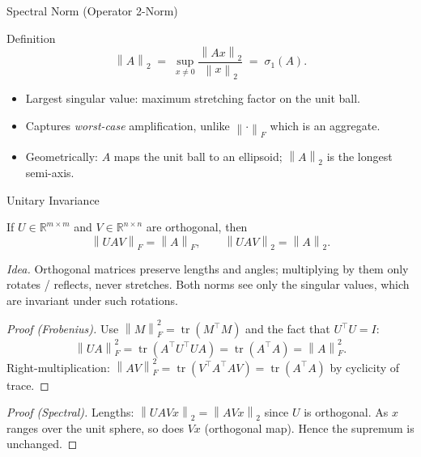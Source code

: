 \documentclass[10pt,aspectratio=169]{beamer}
\DeclareMathOperator{\tr}{tr}
\newcommand{\R}{\mathbb{R}}
\newcommand{\norm}[1]{\left\|#1\right\|}
\begin{document}
\begin{frame}{Spectral Norm (Operator 2-Norm)}
  \begin{block}{Definition}
    \[
      \norm{A}_2 \;=\; \sup_{x \neq 0} \frac{\norm{Ax}_2}{\norm{x}_2}
                 \;=\; \sigma_1(A).
    \]
  \end{block}
  \begin{itemize}
    \item Largest singular value: maximum stretching factor on the unit ball.
    \item Captures \emph{worst-case} amplification, unlike $\norm{\cdot}_F$ which is an aggregate.
    \item Geometrically: $A$ maps the unit ball to an ellipsoid; $\norm{A}_2$ is the longest semi-axis.
  \end{itemize}

  \vspace{0.3cm}
  \begin{center}
  \end{center}
\end{frame}

\begin{frame}{Unitary Invariance}
  \begin{theorem}
    If $U \in \R^{m\times m}$ and $V \in \R^{n\times n}$ are orthogonal, then
    \[
      \norm{UAV}_F = \norm{A}_F, \qquad \norm{UAV}_2 = \norm{A}_2.
    \]
  \end{theorem}
  \emph{Idea.} Orthogonal matrices preserve lengths and angles; multiplying by them only rotates / reflects, never stretches. Both norms see only the singular values, which are invariant under such rotations.

  \begin{proof}[Proof (Frobenius)]
    Use $\norm{M}_F^2 = \tr(M^\top M)$ and the fact that $U^\top U = I$:
    \[
      \norm{UA}_F^2 = \tr(A^\top U^\top U A) = \tr(A^\top A) = \norm{A}_F^2.
    \]
    Right-multiplication: $\norm{AV}_F^2 = \tr(V^\top A^\top A V) = \tr(A^\top A)$ by cyclicity of trace.
  \end{proof}
  \begin{proof}[Proof (Spectral)]
    Lengths: $\norm{UAVx}_2 = \norm{AVx}_2$ since $U$ is orthogonal. As $x$ ranges over the unit sphere, so does $Vx$ (orthogonal map). Hence the supremum is unchanged.
  \end{proof}
\end{frame}
\end{document}
